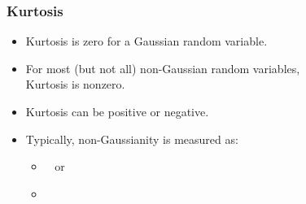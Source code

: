 \begin{frame}
  \frametitle{Kurtosis \cont}


  \begin{itemize}
    \item Kurtosis is zero for a Gaussian random variable. \pause
    \item For most (but not all) non-Gaussian random variables, \\
      Kurtosis is nonzero. \pause
    \item Kurtosis can be positive or negative. \pause
    \item Typically, non-Gaussianity is measured as:
      \begin{itemize}
        \item {} ~ or
        \item {}
      \end{itemize}
  \end{itemize}
\end{frame}


